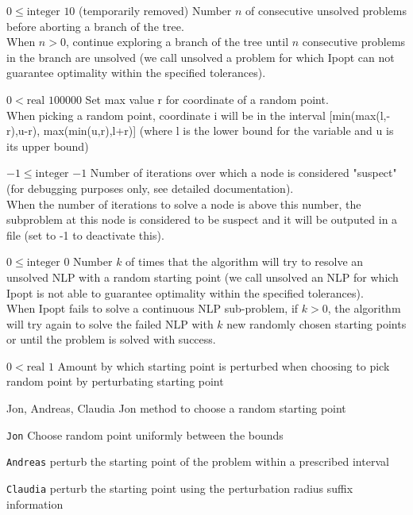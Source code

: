 %
{$0\leq\textrm{integer}$}%
{$10$}%
{(temporarily removed) Number $n$ of consecutive unsolved problems before aborting a branch of the tree.\\
When $n > 0$, continue exploring a branch of the tree until $n$ consecutive problems in the branch are unsolved (we call unsolved a problem for which Ipopt can not guarantee optimality within the specified tolerances).}%
{}

%
{$0<\textrm{real}$}%
{$100000$}%
{Set max value r for coordinate of a random point.\\
When picking a random point, coordinate i will be in the interval [min(max(l,-r),u-r), max(min(u,r),l+r)] (where l is the lower bound for the variable and u is its upper bound)}%
{}

%
{$-1\leq\textrm{integer}$}%
{$-1$}%
{Number of iterations over which a node is considered "suspect" (for debugging purposes only, see detailed documentation).\\
When the number of iterations to solve a node is above this number, the subproblem at this node is considered to be suspect and it will be outputed in a file (set to -1 to deactivate this).}%
{}

%
{$0\leq\textrm{integer}$}%
{$0$}%
{Number $k$ of times that the algorithm will try to resolve an unsolved NLP with a random starting point (we call unsolved an NLP for which Ipopt is not able to guarantee optimality within the specified tolerances).\\
When Ipopt fails to solve a continuous NLP sub-problem, if $k > 0$, the algorithm will try again to solve the failed NLP with $k$ new randomly chosen starting points  or until the problem is solved with success.}%
{}

%
{$0<\textrm{real}$}%
{$1$}%
{Amount by which starting point is perturbed when choosing to pick random point by perturbating starting point}%
{}

%
{Jon, Andreas, Claudia}%
{Jon}%
{method to choose a random starting point}%
{\begin{list}{}{
\setlength{\parsep}{0em}
\setlength{\leftmargin}{5ex}
\setlength{\labelwidth}{2ex}
\setlength{\itemindent}{0ex}
\setlength{\topsep}{0pt}}
\item[\texttt{Jon}] Choose random point uniformly between the bounds
\item[\texttt{Andreas}] perturb the starting point of the problem within a prescribed interval
\item[\texttt{Claudia}] perturb the starting point using the perturbation radius suffix information
\end{list}
}

